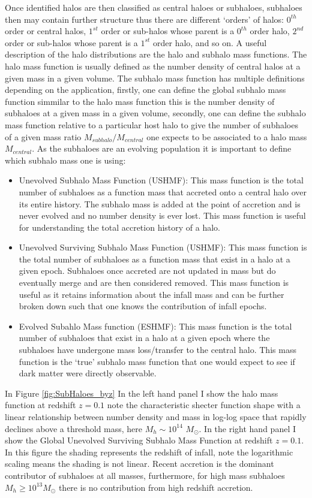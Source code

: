 Once identified halos are then classified as central haloes or subhaloes, subhaloes then may contain further structure thus there are different `orders' of halos: $0^{th}$ order or central halos, $1^{st}$ order or sub-halos whose parent is a $0^{th}$ order halo, $2^{nd}$ order or sub-halos whose parent is a $1^{st}$ order halo, and so on. A useful description of the halo distributions are the halo and subhalo mass functions. The halo mass function is usually defined as the number density of central halos at a given mass in a given volume. The subhalo mass function has multiple definitions depending on the application, firstly, one can define the global subhalo mass function simmilar to the halo mass function this is the number density of subhaloes at a given mass in a given volume, secondly, one can define the subhalo mass function relative to a particular host halo to give the number of subhaloes of a given mass ratio $M_{subhalo}/M_{central}$ one expects to be associated to a halo mass $M_{central}$. As the subhaloes are an evolving population it is important to define which subhalo mass one is using:

\begin{itemize}
    \item Unevolved Subhalo Mass Function (USHMF): This mass function is the total number of subhaloes as a function mass that accreted onto a central halo over its entire history. The subhalo mass is added at the point of accretion and is never evolved and no number density is ever lost. This mass function is useful for understanding the total accretion history of a halo.
    \item Unevolved Surviving Subhalo Mass Function (USHMF): This mass function is the total number of subhaloes as a function mass that exist in a halo at a given epoch. Subhaloes once accreted are not updated in mass but do eventually merge and are then considered removed. This mass function is useful as it retains information about the infall mass and can be further broken down such that one knows the contribution of infall epochs.
    \item Evolved Subahlo Mass function (ESHMF): This mass function is the total number of subhaloes that exist in a halo at a given epoch where the subhaloes have undergone mass loss/transfer to the central halo. This mass function is the `true' subhalo mass function that one would expect to see if dark matter were directly observable.
\end{itemize}

In Figure \ref{fig:SubHaloes_byz} In the left hand panel I show the halo mass function at redshift $z=0.1$ note the characteristic shecter function shape with a linear relationship between number density and mass in log-log space that rapidly declines above a threshold mass, here $M_h\sim 10^{14}$ $M_{\odot}$. In the right hand panel I show the Global Unevolved Surviving Subhalo Mass Function at redshift $z=0.1$. In this figure the shading represents the redshift of infall, note the logarithmic scaling means the shading is not linear. Recent accretion is the dominant contributor of subhaloes at all masses, furthermore, for high mass subhaloes $M_h \geq 10^{13} M_{\odot}$ there is no contribution from high redshift accretion.

